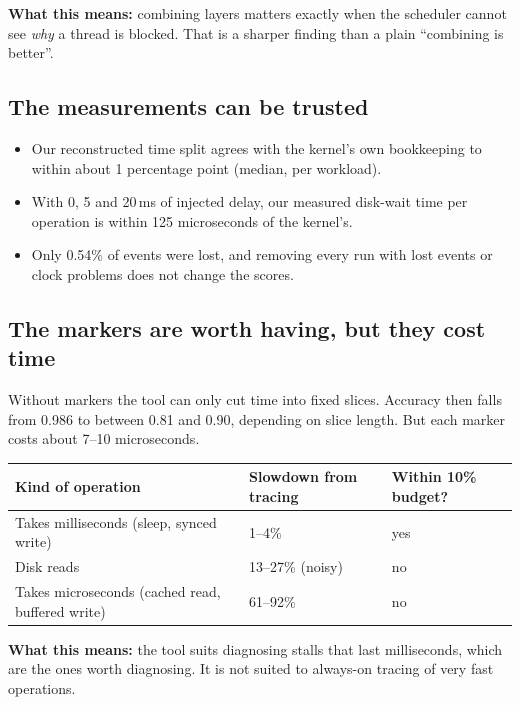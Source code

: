 \documentclass[11pt]{article}
\begin{document}
\begin{means}\textbf{What this means:} combining layers matters exactly when the scheduler cannot see \emph{why} a thread is blocked. That is a sharper finding than a plain ``combining is better''.\end{means}

\subsection{The measurements can be trusted}
\begin{itemize}
\item Our reconstructed time split agrees with the kernel's own bookkeeping to within about 1 percentage point (median, per workload).
\item With 0, 5 and 20\,ms of injected delay, our measured disk-wait time per operation is within 125 microseconds of the kernel's.
\item Only 0.54\% of events were lost, and removing every run with lost events or clock problems does not change the scores.
\end{itemize}

\subsection{The markers are worth having, but they cost time}
Without markers the tool can only cut time into fixed slices. Accuracy then falls from 0.986 to between 0.81 and 0.90, depending on slice length. But each marker costs about 7--10 microseconds.

\begin{center}
\begin{tabularx}{\textwidth}{@{}Yll@{}}
\toprule
Kind of operation & Slowdown from tracing & Within 10\% budget? \\
\midrule
Takes milliseconds (sleep, synced write) & 1--4\% & yes \\
Disk reads & 13--27\% (noisy) & no \\
Takes microseconds (cached read, buffered write) & 61--92\% & no \\
\bottomrule
\end{tabularx}
\end{center}

\begin{means}\textbf{What this means:} the tool suits diagnosing stalls that last milliseconds, which are the ones worth diagnosing. It is not suited to always-on tracing of very fast operations.\end{means}
\end{document}

